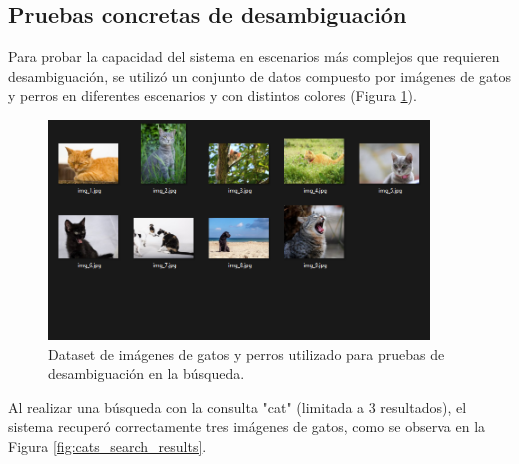 \subsection{Pruebas concretas de desambiguación}
Para probar la capacidad del sistema en escenarios más complejos que requieren desambiguación, se utilizó un conjunto de datos compuesto por imágenes de gatos y perros en diferentes escenarios y con distintos colores (Figura \ref{fig:cats_dogs_dataset_mixed}).

\begin{figure}[H]
\centering
\includegraphics[width=0.9\textwidth]{archivos/cats_dataset.png} %
\caption[Dataset de gatos y perros para desambiguación]{Dataset de imágenes de gatos y perros utilizado para pruebas de desambiguación en la búsqueda.}
\label{fig:cats_dogs_dataset_mixed}
\end{figure}

Al realizar una búsqueda con la consulta "cat" (limitada a 3 resultados), el sistema recuperó correctamente tres imágenes de gatos, como se observa en la Figura \ref{fig:cats_search_results}.


